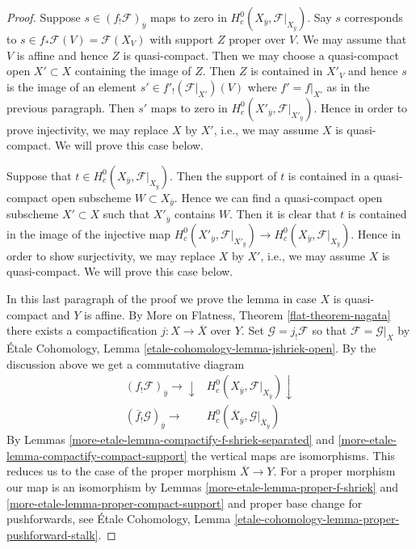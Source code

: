\begin{proof}
\medskip\noindent
Suppose $s \in (f_!\mathcal{F})_{\overline{y}}$ maps to zero in
$H^0_c(X_{\overline{y}}, \mathcal{F}|_{X_{\overline{y}}})$.
Say $s$ corresponds to $s \in f_*\mathcal{F}(V) = \mathcal{F}(X_V)$
with support $Z$ proper over $V$. We may assume that $V$ is affine
and hence $Z$ is quasi-compact. Then we may choose a quasi-compact open
$X' \subset X$ containing the image of $Z$. Then $Z$ is contained in
$X'_V$ and hence $s$ is the image of an element
$s' \in f'_!(\mathcal{F}|_{X'})(V)$ where $f' = f|_{X'}$ as in
the previous paragraph. Then $s'$ maps to zero in
$H^0_c(X'_{\overline{y}}, \mathcal{F}|_{X'_{\overline{y}}})$.
Hence in order to prove injectivity, we may replace $X$ by
$X'$, i.e., we may assume $X$ is quasi-compact. We will prove
this case below.

\medskip\noindent
Suppose that
$t \in H^0_c(X_{\overline{y}}, \mathcal{F}|_{X_{\overline{y}}})$.
Then the support of $t$ is contained in a quasi-compact
open subscheme $W \subset X_{\overline{y}}$.
Hence we can find a quasi-compact open subscheme
$X' \subset X$ such that $X'_{\overline{y}}$ contains $W$.
Then it is clear that $t$ is contained in the image
of the injective map
$H^0_c(X'_{\overline{y}}, \mathcal{F}|_{X'_{\overline{y}}}) \to
H^0_c(X_{\overline{y}}, \mathcal{F}|_{X_{\overline{y}}})$.
Hence in order to show surjectivity, we may replace $X$
by $X'$, i.e., we may assume $X$ is quasi-compact.
We will prove this case below.

\medskip\noindent
In this last paragraph of the proof we prove the lemma in case
$X$ is quasi-compact and $Y$ is affine. By More on Flatness, Theorem
\ref{flat-theorem-nagata} there exists a compactification
$j : X \to \overline{X}$ over $Y$. Set $\mathcal{G} = j_!\mathcal{F}$
so that $\mathcal{F} = \mathcal{G}|_X$ by
\'Etale Cohomology, Lemma \ref{etale-cohomology-lemma-jshriek-open}.
By the discussion above we get a commutative diagram
$$
\begin{array}{cc}(f_!\mathcal{F})_{\overline{y}} \longrightarrow\downarrow & H^0_c(X_{\overline{y}}, \mathcal{F}|_{X_{\overline{y}}}) \downarrow \\ (\overline{f}_!\mathcal{G})_{\overline{y}} \longrightarrow & H^0_c(\overline{X}_{\overline{y}}, \mathcal{G}|_{\overline{X}_{\overline{y}}})\end{array}
$$
By Lemmas \ref{more-etale-lemma-compactify-f-shriek-separated} and
\ref{more-etale-lemma-compactify-compact-support} the vertical maps
are isomorphisms. This reduces us to the case of the proper
morphism $\overline{X} \to Y$. For a proper morphism our map
is an isomorphism by
Lemmas \ref{more-etale-lemma-proper-f-shriek} and \ref{more-etale-lemma-proper-compact-support}
and proper base change for pushforwards, see
\'Etale Cohomology, Lemma
\ref{etale-cohomology-lemma-proper-pushforward-stalk}.
\end{proof}

